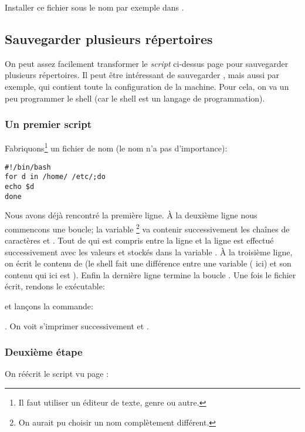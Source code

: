 Installer ce fichier sous le nom  par exemple dans
. 

\subsection{Sauvegarder plusieurs répertoires}
On peut assez facilement transformer le \emph{script} ci-dessus page
\pageref{save1} pour 
sauvegarder plusieurs répertoires. Il peut être intéressant de
sauvegarder , mais aussi  par exemple, qui
contient toute la configuration de la machine. Pour cela, on va un peu
programmer le shell (car le shell est un langage de programmation).

\subsubsection{Un premier script}
Fabriquons\footnote{Il faut utiliser un éditeur de texte, genre
   ou autre.} un fichier de nom  (le nom n'a
pas d'importance):
\begin{center}
\begin{boxedminipage}{0.85\textwidth}
\begin{verbatim}
#!/bin/bash
for d in /home/ /etc/;do
echo $d
done
\end{verbatim}
\end{boxedminipage}
\end{center}
Nous avons déjà rencontré la première ligne. \`A la deuxième ligne nous
commencons une boucle; la variable \footnote{On aurait pu
  choisir un nom complètement différent.} va contenir successivement
les chaînes de caractères  et . Tout de qui est
compris entre la ligne  et la ligne  est
effectué successivement avec les valeurs  et 
stockés dans la 
  variable . \`A la
troisième ligne, on écrit le contenu de  (le shell fait une
différence entre une variable ( ici) et son contenu qui ici est
). Enfin la dernière ligne termine la boucle .
Une fois le fichier écrit, rendons le exécutable:


et lançons la commande:

.
On voit s'imprimer successivement   et .
\subsubsection{Deuxième étape} On réécrit le script vu page
\pageref{save1}:

